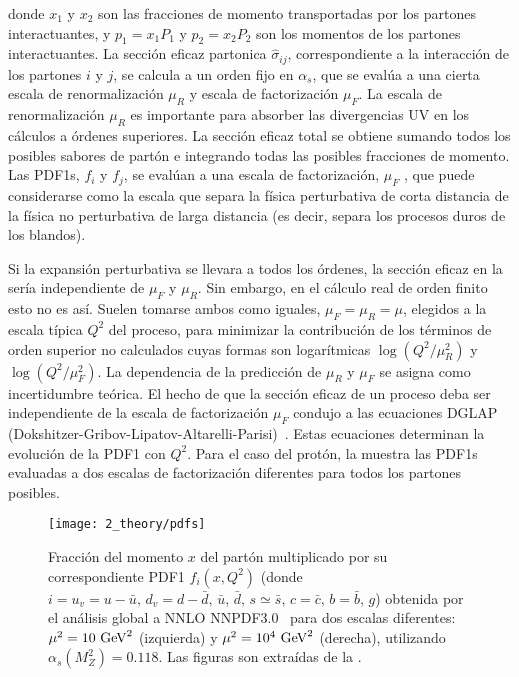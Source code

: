 donde \(x_1\) y \(x_2\) son las fracciones de momento transportadas por los partones interactuantes, y \(p_1 = x_1 P_1\) y \(p_2 = x_2 P_2\) son los momentos de los partones interactuantes. La sección eficaz partonica \(\hat{\sigma}_{ij}\), correspondiente a la interacción de los partones \(i\) y \(j\), se calcula a un orden fijo en \(\alpha_s\), que se evalúa a una cierta escala de renormalización \(\mu_R\) y escala de factorización \(\mu_F\). La escala de renormalización \(\mu_R\) es importante para absorber las divergencias \ac{UV} en los cálculos a órdenes superiores. La sección eficaz total se obtiene sumando todos los posibles sabores de partón e integrando todas las posibles fracciones de momento. Las \acp{PDF1}, \(f_i\) y \(f_j\), se evalúan a una escala de factorización, \(\mu_F\) , que puede considerarse como la escala que separa la física perturbativa de corta distancia de la física no perturbativa de larga distancia (es decir, separa los procesos duros de los blandos).

Si la expansión perturbativa se llevara a todos los órdenes, la sección eficaz en la \Eqn{\ref{eq:theory:sm:hadron_interactions:xs}} sería independiente de \(\mu_F\) y \(\mu_R\). Sin embargo, en el cálculo real de orden finito esto no es así. Suelen tomarse ambos como iguales, \(\mu_F = \mu_R = \mu\), elegidos a la escala típica \(Q^2\) del proceso, para minimizar la contribución de los términos de orden superior no calculados cuyas formas son logarítmicas \(\log\left(Q^2/\mu_R^2\right)\) y \(\log\left(Q^2/\mu_F^2\right)\). La dependencia de la predicción de \(\mu_R\) y \(\mu_F\) se asigna como incertidumbre teórica. El hecho de que la sección eficaz de un proceso deba ser independiente de la escala de factorización \(\mu_F\) condujo a las ecuaciones DGLAP (Dokshitzer-Gribov-Lipatov-Altarelli-Parisi)~\cite{Dokshitzer-1977,Gribov_Lipatov-1971,Altarelli_Parisi-1977}. Estas ecuaciones determinan la evolución de la \ac{PDF1} con \(Q^2\).
Para el caso del protón, la \Fig{\ref{fig:theory:sm:hadron_interactions:pdfs}} muestra las \acp{PDF1} evaluadas a dos escalas de factorización diferentes para todos los partones posibles.

\begin{figure}[ht!]
    \centering
    \texttt{[image: 2\_theory/pdfs]}
    \caption{Fracción del momento \(x\) del partón multiplicado por su correspondiente \acs{PDF1} \(f_i(x, Q^2)\) (donde \(i = u_v = u - \bar{u}, \, d_v = d - \bar{d},\, \bar{u},\, \bar{d},\, s\simeq\bar{s},\, c=\bar{c},\, b=\bar{b},\, g \)) obtenida por el análisis global a \ac{NNLO} NNPDF3.0~\cite{NNPDF} para dos escalas diferentes: \(\mu^2 = 10~\text{GeV}^2\) (izquierda) y \(\mu^2 = 10^4~\text{GeV}^2\) (derecha), utilizando \(\alpha_s(M_Z^2) = 0.118\). Las figuras son extraídas de la .}
    \label{fig:theory:sm:hadron_interactions:pdfs}
\end{figure}





